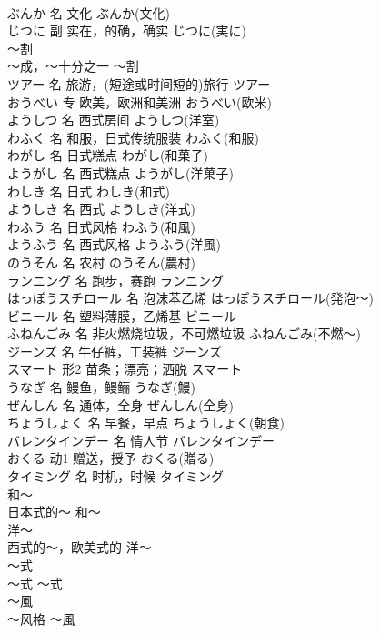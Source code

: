 \documentclass[8pt]{extreport}
\begin{document}
\begin{CJK}{UTF8}{min}
\\	ぶんか	名	文化	ぶんか(文化)	
\\	じつに	副	实在，的确，确实	じつに(実に)	
\\	～割	
\\	～成，～十分之一	～割	
\\	ツアー	名	旅游，(短途或时间短的)旅行	ツアー	
\\	おうべい	专	欧美，欧洲和美洲	おうべい(欧米)	
\\	ようしつ	名	西式房间	ようしつ(洋室)	
\\	わふく	名	和服，日式传统服装	わふく(和服)	
\\	わがし	名	日式糕点	わがし(和菓子)	
\\	ようがし	名	西式糕点	ようがし(洋菓子)	
\\	わしき	名	日式	わしき(和式)	
\\	ようしき	名	西式	ようしき(洋式)	
\\	わふう	名	日式风格	わふう(和風)	
\\	ようふう	名	西式风格	ようふう(洋風)	
\\	のうそん	名	农村	のうそん(農村)	
\\	ランニング	名	跑步，赛跑	ランニング	
\\	はっぽうスチロール	名	泡沫苯乙烯	はっぽうスチロール(発泡～)	
\\	ビニール	名	塑料薄膜，乙烯基	ビニール	
\\	ふねんごみ	名	非火燃烧垃圾，不可燃垃圾	ふねんごみ(不燃～)	
\\	ジーンズ	名	牛仔裤，工装裤	ジーンズ	
\\	スマート	形2	苗条；漂亮；洒脱	スマート	
\\	うなぎ	名	鳗鱼，鳗鲡	うなぎ(鰻)	
\\	ぜんしん	名	通体，全身	ぜんしん(全身)	
\\	ちょうしょく	名	早餐，早点	ちょうしょく(朝食)	
\\	バレンタインデー	名	情人节	バレンタインデー	
\\	おくる	动1	赠送，授予	おくる(贈る)	
\\	タイミング	名	时机，时候	タイミング	
\\	和～	
\\	日本式的～	和～	
\\	洋～	
\\	西式的～，欧美式的	洋～	
\\	～式	
\\	～式	～式	
\\	～風	
\\	～风格	～風	

\end{CJK}
\end{document}
